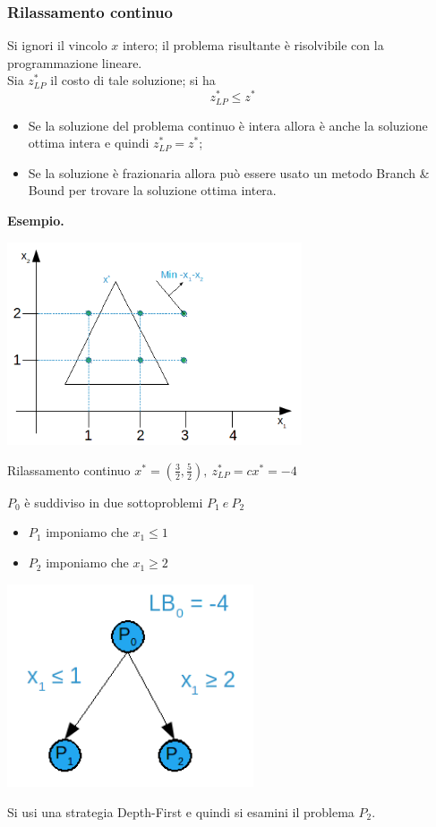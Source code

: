\subsubsection{Rilassamento continuo}

Si ignori il vincolo $x$ intero; il problema risultante è risolvibile con la programmazione lineare.\\
Sia $z_{LP}^{*}$ il costo di tale soluzione; si ha
\begin{equation*}
	z_{LP}^{*}\le z^{*}
\end{equation*}
\begin{itemize}
	\item Se la soluzione del problema continuo è intera allora è anche la soluzione ottima intera e quindi $z_{LP}^{*}=z^{*}$;
	\item Se la soluzione è frazionaria allora può essere usato un metodo Branch \& Bound per trovare la soluzione ottima intera.
\end{itemize}

\textbf{Esempio.}

\centerline{\includegraphics[height=6cm]{images/graph19.png}}
Rilassamento continuo $x^{*}=(\frac{3}{2},\frac{5}{2}),\ z_{LP}^{*}=cx^{*}=-4$

$P_{0}$ è suddiviso in due sottoproblemi $P_{1}\ e\ P_{2}$
\begin{itemize}
	\item $P_{1}$ imponiamo che $x_{1}\le 1$
	\item $P_{2}$ imponiamo che $x_{1}\ge 2$
\end{itemize}

\centerline{\includegraphics[height=6cm]{images/graph20.png}}
Si usi una strategia Depth-First e quindi si esamini il problema $P_{2}$.

